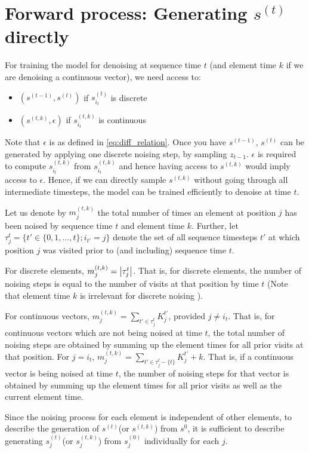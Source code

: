 \section{Forward process: Generating $s^{(t)}$ directly}
\label{app:sec:fwd_prcs}
For training the model for denoising at sequence time $t$ (and element time $k$ if we are denoising a continuous vector), we need access to:
\begin{itemize}
    \item $(s^{(t-1)}, s^{(t)})$ if $s^{(t)}_{i_t}$ is discrete 
    \item $(s^{(t, k)}, \epsilon)$ if $s^{(t, k)}_{i_t}$ is continuous
\end{itemize}
Note that $\epsilon$ is as defined in \eqref{eq:diff_relation}. Once you have $s^{(t-1)}$, $s^{(t)}$ can be generated by applying one discrete noising step, by sampling $z_{t-1}$. $\epsilon$ is required to compute $s^{(t, k)}_{i_t}$ from $s^{(t, k)}_{i_t}$ and hence having access to $s^{(t, k)}$ would imply access to $\epsilon$. Hence, if we can directly sample $s^{(t, k)}$ without going through all intermediate timesteps, the model can be trained efficiently to denoise at time $t$.

Let us denote by $m_{j}^{(t, k)}$ the total number of times an element at position $j$ has been noised by sequence time $t$ and element time $k$. Further, let $\tau_j^t = \{t' \in \{0, 1, \dots, t\};i_{t'} = j  \}$ denote the set of all sequence timesteps $t'$ at which position $j$ was visited prior to (and including) sequence time $t$.

For discrete elements, $ m_{j}^{(t, k)} = \abs{\tau_j^t}$. That is, for discrete elements, the number of noising steps is equal to the number of visits at that position by  time $t$ (Note that element time $k$ is irrelevant for discrete noising ).

For continuous vectors, $m_{j}^{(t, k)} = \sum_{t' \in \tau_j^t} K^{t'}_{j}$, provided $j \neq i_t$. That is, for continuous vectors which are not being noised at time $t$, the total number of noising steps are obtained by summing up the element times for all prior visits at that position. For $j = i_t$, $m_{j}^{(t, k)} = \sum_{t' \in \tau_j^t - \{t\}} K^{t'}_{j} + k$. That is, if a continuous vector is being noised at time $t$, the number of noising steps for that vector is obtained by summing up the element times for all prior visits as well as the current element time.

Since the noising process for each element is independent of other elements, to describe the generation of $s^{(t)}$(or $s^{(t, k)}$) from $s^{0}$,  it is sufficient to describe generating $s_{j}^{(t)}$(or $s_{j}^{(t, k)}$) from $s_{j}^{(0)}$ individually for each $j$. 

